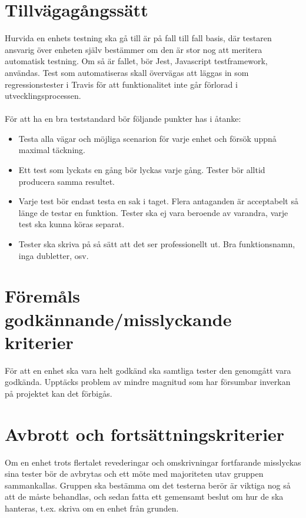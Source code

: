 \section{Tillvägagångssätt}
	Hurvida en enhets testning ska gå till är på fall till fall basis, där testaren ansvarig över enheten själv bestämmer om den är stor nog att meritera automatisk testning.
	Om så är fallet, bör Jest, Javascript testframework, användas. Test som automatiseras skall övervägas att läggas in som regressionstester i Travis för att funktionalitet inte går förlorad i utvecklingsprocessen. \\
	\\
	För att ha en bra teststandard bör följande punkter has i åtanke:
	\begin {itemize}
	 \item [Genomgående] Testa alla vägar och möjliga scenarion för varje enhet och försök uppnå maximal täckning.
	 \item [Repeterbar] Ett test som lyckats en gång bör lyckas varje gång. Tester bör alltid producera samma resultet.
	 \item [Oberoende] Varje test bör endast testa en sak i taget. Flera antaganden är acceptabelt så länge de testar en funktion. Tester ska ej vara beroende av varandra, varje test ska kunna köras separat.
	 \item [Kodstandard] Tester ska skriva på så sätt att det ser professionellt ut. Bra funktionsnamn, inga dubletter, osv.
	\end {itemize}

	

\section{Föremåls godkännande/misslyckande kriterier}
	För att en enhet ska vara helt godkänd ska samtliga tester den genomgått vara godkända. Upptäcks problem av mindre magnitud som har försumbar inverkan på projektet kan det förbigås.



\section{Avbrott och fortsättningskriterier}
	Om en enhet trots flertalet revederingar och omskrivningar fortfarande misslyckas sina tester bör de avbrytas och ett möte med majoriteten utav gruppen sammankallas. 
	Gruppen ska bestämma om det testerna berör är viktiga nog så att de måste behandlas, och sedan fatta ett gemensamt beslut om hur de ska hanteras, t.ex. skriva om en enhet från grunden.



